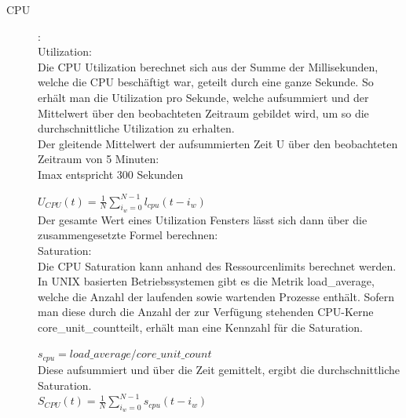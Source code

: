 \documentclass[a4paper,10pt]{scrartcl}
\begin{document}
\begin{description}
\item[CPU]:\\
Utilization:\\
Die CPU Utilization berechnet sich aus der Summe der Millisekunden, welche die CPU beschäftigt war, geteilt durch eine ganze Sekunde. So erhält man die Utilization pro Sekunde, welche aufsummiert und der Mittelwert über den beobachteten Zeitraum gebildet wird, um so die durchschnittliche Utilization zu erhalten.\\

Der gleitende Mittelwert der aufsummierten Zeit U über den beobachteten Zeitraum von 5 Minuten:\\
Imax entspricht 300 Sekunden

\(
\displaystyle{U_{CPU}(t)=\frac{1}{N}{\sum\limits_{i_{w}=0}^{N-1} l_{cpu}{(t-i_{w})}} }
\) 
\\

Der gesamte Wert eines Utilization Fensters lässt sich dann über die zusammengesetzte Formel berechnen:\\

Saturation:\\
Die CPU Saturation kann anhand des Ressourcenlimits berechnet werden. In UNIX basierten Betriebssystemen gibt es die Metrik \glqq load\_average\grqq, welche die Anzahl der laufenden sowie wartenden Prozesse enthält. Sofern man diese durch die Anzahl der zur Verfügung stehenden CPU-Kerne \glqq core\_unit\_count\grqq teilt, erhält man eine Kennzahl für die Saturation.

\(
\displaystyle{s_{cpu}= load\_average / core\_unit\_count}
\)
\\

Diese aufsummiert und über die Zeit gemittelt, ergibt die durchschnittliche Saturation.\\


\(
\displaystyle{S_{CPU}(t)=\frac{1}{N}{\sum\limits_{i_{w}=0}^{N-1} s_{cpu}{(t-i_{w})}} }
\)
\\


\end{description}
\end{document}
